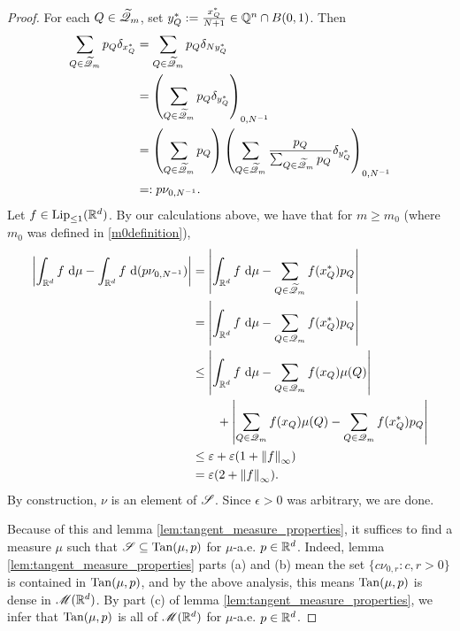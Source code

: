 \begin{proof}
    For each $Q \in \widetilde{\mathscr{Q}}_m$, set $y_Q^* := \frac{x_Q^*}{N+1} \in \mathbb{Q}^n \cap B(0,1)$. Then 
    \begin{equation}
        \begin{aligned}
            \sum_{Q \in \widetilde{\mathscr{Q}}_m} p_Q \delta_{x_Q^*} 
            &= \sum_{Q \in \widetilde{\mathscr{Q}}_m} p_Q \delta_{Ny_Q^*} \\
            &= \left( \sum_{Q \in \widetilde{\mathscr{Q}}_m} p_Q \delta_{y_Q^*} \right)_{0,N^{-1}} \\
            &= \left( \sum_{Q \in \widetilde{\mathscr{Q}}_m} p_Q \right) \left( \sum_{Q \in \widetilde{\mathscr{Q}}_m} \frac{p_Q}{\sum_{Q \in \widetilde{\mathscr{Q}}_m} p_Q} \delta_{y_Q^*} \right)_{0,N^{-1}} \\
            &=: p \nu_{0,N^{-1}}.
        \end{aligned}
    \end{equation}
    Let $f \in \operatorname{Lip}_{\leq 1}(\mathbb{R}^d)$. By our calculations above, we have that for $m \geq m_0$ (where $m_0$ was defined in \eqref{m0definition}),
    \begin{equation}
        \begin{aligned}
          \left\vert { \int_{\mathbb{R}^d} f \, \ensuremath{\operatorname{d}\!{\mu}} - \int_{\mathbb{R}^d} f \, \ensuremath{\operatorname{d}\!{(p\nu_{0,N^{-1}})}} } \right\vert
          &= \left\vert { \int_{\mathbb{R}^d} f \, \ensuremath{\operatorname{d}\!{\mu}} - \sum_{Q \in \widetilde{\mathscr{Q}}_m} f(x_Q^*) p_Q } \right\vert \\
          &= \left\vert { \int_{\mathbb{R}^d} f \, \ensuremath{\operatorname{d}\!{\mu}} - \sum_{Q \in \mathscr{Q}_m} f(x_Q^*) p_Q } \right\vert \\
          &\leq \left\vert { \int_{\mathbb{R}^d} f \, \ensuremath{\operatorname{d}\!{\mu}} - \sum_{Q \in \mathscr{Q}_m} f(x_Q)\mu(Q) } \right\vert \\
          &\hspace{20pt} + \left\vert { \sum_{Q \in \mathscr{Q}_m} f(x_Q)\mu(Q) - \sum_{Q \in \mathscr{Q}_m} f(x_Q^*)p_Q } \right\vert \\
          &\leq \varepsilon + \varepsilon(1 + \left\Vert {f} \right\Vert_\infty) \\
          &= \varepsilon(2 + \left\Vert {f} \right\Vert_\infty).
        \end{aligned}
    \end{equation}
    By construction, $\nu$ is an element of $\mathscr{S}$. Since $\epsilon > 0$ was arbitrary, we are done.

    Because of this and lemma \ref{lem:tangent_measure_properties}, it suffices to find a measure $\mu$ such that $\mathscr{S} \subseteq \operatorname{Tan}(\mu,p)$ for $\mu$-a.e. $p \in \mathbb{R}^d$. Indeed, lemma \ref{lem:tangent_measure_properties} parts (a) and (b) mean the set $\{ c\nu_{0,r} : c,r>0 \}$ is contained in $\operatorname{Tan}(\mu,p)$, and by the above analysis, this means $\operatorname{Tan}(\mu,p)$ is dense in $\mathscr{M}(\mathbb{R}^d)$. By part (c) of lemma \ref{lem:tangent_measure_properties}, we infer that $\operatorname{Tan}(\mu,p)$ is all of $\mathscr{M}(\mathbb{R}^d)$ for $\mu$-a.e. $p \in \mathbb{R}^d$. 


\end{proof}
